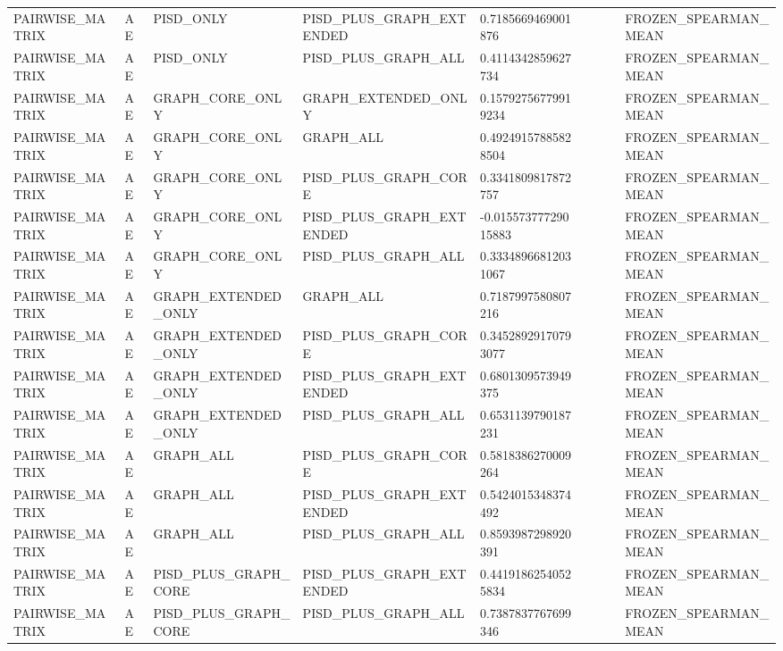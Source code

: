 \begin{longtable}{lllllllll}
PAIRWISE\_MATRIX & AE & PISD\_ONLY & PISD\_PLUS\_GRAPH\_EXTENDED & 0.7185669469001876 &  &  &  & FROZEN\_SPEARMAN\_MEAN \\
PAIRWISE\_MATRIX & AE & PISD\_ONLY & PISD\_PLUS\_GRAPH\_ALL & 0.4114342859627734 &  &  &  & FROZEN\_SPEARMAN\_MEAN \\
PAIRWISE\_MATRIX & AE & GRAPH\_CORE\_ONLY & GRAPH\_EXTENDED\_ONLY & 0.15792756779919234 &  &  &  & FROZEN\_SPEARMAN\_MEAN \\
PAIRWISE\_MATRIX & AE & GRAPH\_CORE\_ONLY & GRAPH\_ALL & 0.49249157885828504 &  &  &  & FROZEN\_SPEARMAN\_MEAN \\
PAIRWISE\_MATRIX & AE & GRAPH\_CORE\_ONLY & PISD\_PLUS\_GRAPH\_CORE & 0.3341809817872757 &  &  &  & FROZEN\_SPEARMAN\_MEAN \\
PAIRWISE\_MATRIX & AE & GRAPH\_CORE\_ONLY & PISD\_PLUS\_GRAPH\_EXTENDED & -0.01557377729015883 &  &  &  & FROZEN\_SPEARMAN\_MEAN \\
PAIRWISE\_MATRIX & AE & GRAPH\_CORE\_ONLY & PISD\_PLUS\_GRAPH\_ALL & 0.33348966812031067 &  &  &  & FROZEN\_SPEARMAN\_MEAN \\
PAIRWISE\_MATRIX & AE & GRAPH\_EXTENDED\_ONLY & GRAPH\_ALL & 0.7187997580807216 &  &  &  & FROZEN\_SPEARMAN\_MEAN \\
PAIRWISE\_MATRIX & AE & GRAPH\_EXTENDED\_ONLY & PISD\_PLUS\_GRAPH\_CORE & 0.34528929170793077 &  &  &  & FROZEN\_SPEARMAN\_MEAN \\
PAIRWISE\_MATRIX & AE & GRAPH\_EXTENDED\_ONLY & PISD\_PLUS\_GRAPH\_EXTENDED & 0.6801309573949375 &  &  &  & FROZEN\_SPEARMAN\_MEAN \\
PAIRWISE\_MATRIX & AE & GRAPH\_EXTENDED\_ONLY & PISD\_PLUS\_GRAPH\_ALL & 0.6531139790187231 &  &  &  & FROZEN\_SPEARMAN\_MEAN \\
PAIRWISE\_MATRIX & AE & GRAPH\_ALL & PISD\_PLUS\_GRAPH\_CORE & 0.5818386270009264 &  &  &  & FROZEN\_SPEARMAN\_MEAN \\
PAIRWISE\_MATRIX & AE & GRAPH\_ALL & PISD\_PLUS\_GRAPH\_EXTENDED & 0.5424015348374492 &  &  &  & FROZEN\_SPEARMAN\_MEAN \\
PAIRWISE\_MATRIX & AE & GRAPH\_ALL & PISD\_PLUS\_GRAPH\_ALL & 0.8593987298920391 &  &  &  & FROZEN\_SPEARMAN\_MEAN \\
PAIRWISE\_MATRIX & AE & PISD\_PLUS\_GRAPH\_CORE & PISD\_PLUS\_GRAPH\_EXTENDED & 0.44191862540525834 &  &  &  & FROZEN\_SPEARMAN\_MEAN \\
PAIRWISE\_MATRIX & AE & PISD\_PLUS\_GRAPH\_CORE & PISD\_PLUS\_GRAPH\_ALL & 0.7387837767699346 &  &  &  & FROZEN\_SPEARMAN\_MEAN \\

\end{longtable}
